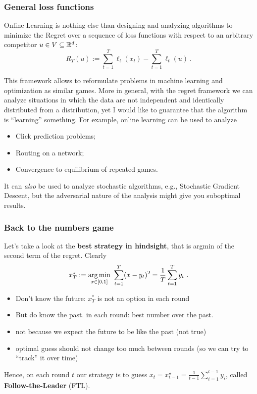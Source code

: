 \documentclass{beamer}
\begin{document}
\begin{frame}
  \frametitle{General loss functions}
  Online Learning is nothing else than designing and analyzing algorithms to minimize the Regret over a sequence of loss functions with respect to an arbitrary competitor $u \in V\subseteq \mathbb{R}^d$:
  \[
    R_T(u):=\sum_{t=1}^T \ell_t(x_t) - \sum_{t=1}^T \ell_t(u)~.
  \]

  This framework allows to reformulate problems in machine learning and optimization as similar games.
  More in general, with the regret framework we can analyze situations in which the data are not independent and identically distributed from a distribution, yet I would like to guarantee that the algorithm is ``learning'' something.
  For example, online learning can be used to analyze
  \begin{itemize}
    \item Click prediction problems;
    \item Routing on a network;
    \item Convergence to equilibrium of repeated games.
  \end{itemize}
  It can \emph{also} be used to analyze stochastic algorithms, e.g., Stochastic Gradient Descent, but the adversarial nature of the analysis might give you suboptimal results.
\end{frame}


\begin{frame}
  \frametitle{Back to the numbers game}
  Let's take a look at the \textbf{best strategy in hindsight}, that is argmin of the second term of the regret. Clearly
  \[
    x^\star_T := \operatorname*{arg\,min}_{x \in [0,1]} \ \sum_{t=1}^T (x - y_t)^2 = \frac{1}{T} \sum_{t=1}^T y_t~.
  \]
  \begin{itemize}
    \item Don't know the future: $x^*_T$ is not an option in each round
    \item But do know the past. in each round: best number over the past.
    \item not because we expect the future to be like the past (not true)
    \item optimal guess should not change too much between rounds (so we can try to ``track'' it over time)
  \end{itemize}
  Hence, on each round $t$ our strategy is to guess $x_t = x_{t-1}^\star=\frac{1}{t-1} \sum_{i=1}^{t-1} y_i$, called \textbf{Follow-the-Leader} (FTL).
\end{frame}
\end{document}
